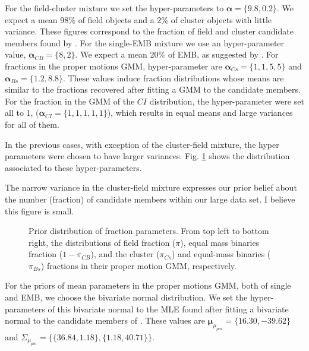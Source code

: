 For the field-cluster mixture we set the hyper-parameters to $\boldsymbol{\alpha}=\{9.8,0.2\}$. We expect a mean 98\% of field objects and a 2\% of cluster objects with little variance. These figures correspond to the fraction of field and cluster candidate members found by \citet{Bouy2015}. 
For the single-EMB mixture we use an hyper-parameter value, $\boldsymbol{\alpha}_{CB}=\{8,2\}$. We expect a mean 20\% of EMB, as suggested by \citet{Bouy2015}. 
For fractions in the proper motions GMM, hyper-parameter are $\boldsymbol{\alpha}_{Cs}=\{1,1,5,5\}$ and $\boldsymbol{\alpha}_{Bs}=\{1.2,8.8\}$. These values induce fraction distributions whose means are similar to the fractions recovered after fitting a GMM to the \citet{Bouy2015} candidate members. 
For the fraction in the GMM of the $CI$ distribution, the hyper-parameter were set all to 1, ($\boldsymbol{\alpha}_{CI}=\{1,1,1,1,1\}$), which results in equal means and large variances for all of them.

In the previous cases, with exception of the cluster-field mixture, the hyper parameters were chosen to have larger variances. Fig.  \ref{figure:priors} shows the distribution associated to these hyper-parameters.

The narrow variance in the cluster-field mixture expresses our prior belief about the number (fraction) of candidate members within our large data set. I believe this figure is small.

\begin{figure}[htbp]
\begin{center}
\caption{Prior distribution of fraction parameters. From top left to bottom right, the distributions of field fraction ($\pi$), equal mass binaries fraction ($1-\pi_{CB}$), and the cluster ($\pi_{Cs}$) and equal-mass binaries ($\pi_{Bs}$) fractions in their proper motion GMM, respectively.}
\label{figure:priors}
\end{center}
\end{figure}


For the priors of mean parameters in the proper motions GMM, both of single and EMB, we choose the bivariate normal distribution. We set the hyper-parameters of this bivariate normal to the MLE found after fitting a bivariate normal to the candidate members of \citet{Bouy2015}. These values are $\boldsymbol{\mu}_{\mu_{pm}}=\{16.30,-39.62\}$ and $\Sigma_{\mu_{pm}}=\{\{36.84,1.18\},\{1.18,40.71\}\}$. 

